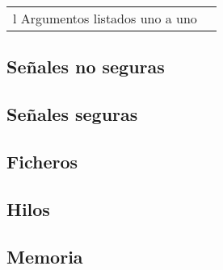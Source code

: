 \documentclass[a4paper,10pt]{article}
\begin{document}
            \begin{table}
            \begin{tabular}{ll}
                l   Argumentos listados uno a uno   \\
            \end{tabular}
            \end{table}


            




        \subsection{Señales no seguras}

        \subsection{Señales seguras}

        \subsection{Ficheros}

        \subsection{Hilos}

        \subsection{Memoria}
\end{document}
